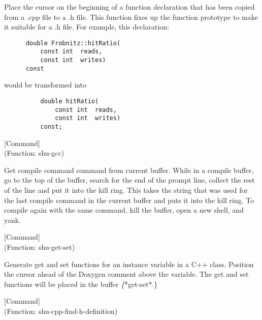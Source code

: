 \begin{doc-string}
Place the cursor on the beginning of a function declaration that has been
copied from a .cpp file to a .h file.  This function fixes up the function
prototype to make it suitable for a .h file.
For example, this declaration:

\small{\begin{verbatim}
      double Frobnitz::hitRatio(
          const int  reads,
          const int  writes)
      const
\end{verbatim}}

would be transformed into

\small{\begin{verbatim}
          double hitRatio(
              const int  reads,
              const int  writes)
          const;
\end{verbatim}}
\end{doc-string}

\vspace{1em}
\noindent
{}
\usebox{\funcname}
 \hfill [Command]\\%
 (Function: shu-gcc)

\begin{doc-string}
Get compile command command from current buffer.  While in a compile buffer,
go to the top of the buffer, search for the end of the prompt line, collect the
rest of the line and put it into the kill ring.  This takes the string that was
used for the last compile command in the current buffer and puts it into the
kill ring.  To compile again with the same command, kill the buffer, open a new
shell, and yank.
\end{doc-string}

\vspace{1em}
\noindent
{}
\usebox{\funcname}
 \hfill [Command]\\%
 (Function: shu-get-set)

\begin{doc-string}
Generate get and set functions for an instance variable in a C++ class.
Position the cursor ahead of the Doxygen comment above the variable.  The get
and set functions will be placed in the buffer \emph\{*get-set*.\}
\end{doc-string}

\vspace{1em}
\noindent
{}
\usebox{\funcname}
 \hfill [Command]\\%
 (Function: shu-cpp-find-h-definition)

